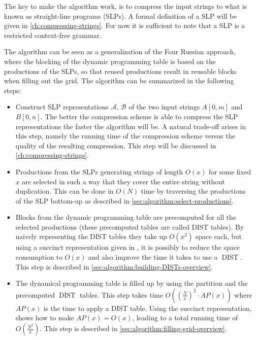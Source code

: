 \documentclass[twoside,11pt,openright]{report}
\newcommand{\DIST}{\operatorname{DIST}}
\newcommand{\str}[3]{#1[#2, #3]}
\newcommand{\SLP}[1] {\mathcal{#1}}
\begin{document}
The key to make the algorithm work, is to compress the input strings to what is known as straight-line programs (SLPs). A formal definition of a SLP will be given in \cref{ch:compressing-strings}. For now it is sufficient to note that a SLP is a restricted context-free grammar.

The algorithm can be seen as a generalization of the Four Russian approach, where the blocking of the dynamic programming table is based on the productions of the SLPs, so that reused productions result in reusable blocks when filling out the grid. The algorithm can be summarized in the following steps:
\begin{itemize}
  \item Construct SLP representations $\SLP{A}$, $\SLP{B}$ of the two input strings $\str{A}{0}{m}$ and $\str{B}{0}{n}$. The better the compression scheme is able to compress the SLP representations the faster the algorithm will be. A natural trade-off arises in this step, namely the running time of the compression scheme versus the quality of the resulting compression. This step will be discussed in \cref{ch:compressing-strings}.
  \item Productions from the SLPs generating strings of length $O(x)$ for some fixed $x$ are selected in such a way that they cover the entire string without duplication. This can be done in $O(N)$ time by traversing the productions of the SLP bottom-up as described in \cref{sec:algorithm:select-productions}.
  \item Blocks from the dynamic programming table are precomputed for all the selected productions (these precomputed tables are called DIST tables). By naively representing the DIST tables they take up $O(x^2)$ space each, but using a succinct representation given in \cite{DBLP:journals/corr/abs-0707-3619}, it is possibly to reduce the space consumption to $O(x)$ and also improve the time it takes to use a $\DIST$. This step is described in \cref{sec:algorithm:building-DISTs-overview}.
  \item The dynamical programming table is filled up by using the partition and the precomputed $\DIST$ tables. This step takes time $O\left(\left(\frac{N}{x}\right)^2 \cdot AP(x)\right)$ where $AP(x)$ is the time to apply a DIST table. Using the succinct representation, \cite{Gawrychowski:2012:FAC:2422024.2422048} shows how to make $AP(x) = O(x)$, leading to a total running time of $O(\frac{N^2}{x})$. This step is described in \cref{sec:algorithm:filling-grid-overview}.
\end{itemize}
\end{document}
